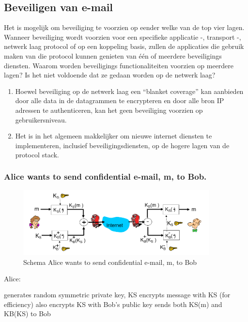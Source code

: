 \newpage
\subsection{Beveiligen van e-mail}

\noindent Het is mogelijk om beveiliging te voorzien op eender welke van de top vier lagen. Wanneer beveiliging wordt voorzien voor een specifieke applicatie -, transport -, netwerk laag protocol of op een koppeling basis, zullen de applicaties die gebruik maken van die protocol kunnen genieten van één of meerdere beveiligings diensten.
Waarom worden beveiligings functionaliteiten voorzien op meerdere lagen? Is het niet voldoende dat ze gedaan worden op de netwerk laag?
\begin{enumerate}
    \item	Hoewel beveiliging op de netwerk laag een “blanket coverage” kan aanbieden door alle data in de datagrammen te encrypteren en door alle bron IP adressen te authenticeren, kan het geen beveiliging voorzien op gebruikersniveau.
    \item Het is in het algemeen makkelijker om nieuwe internet diensten te implementeren,
    inclusief beveiligingsdiensten, op de hogere lagen van de protocol stack.
\end{enumerate}

\subsubsection{Alice wants to send confidential e-mail, m, to Bob.}

\begin{figure}[h]
    \centering
    \includegraphics[width=4in]{./img/imghfdst8/hfdst8puntje23.png}
    \caption{Schema Alice wants to send confidential e-mail, m, to Bob }      
    \label{fig:Schema Alice wants to send confidential e-mail, m, to Bob }
\end{figure}

\noindent Alice:

\bi
\itf generates random symmetric private key, KS
\itf encrypts message with KS  (for efficiency)
\itf also encrypts KS with Bob’s public key
\itf sends both KS(m) and KB(KS) to Bob
\ei

